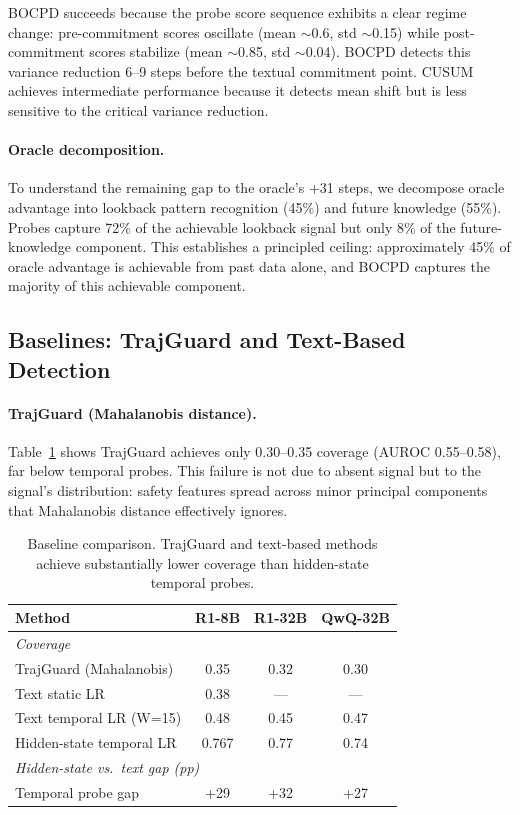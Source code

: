 \documentclass[11pt,a4paper]{article}
\begin{document}
BOCPD succeeds because the probe score sequence exhibits a clear regime change: pre-commitment scores oscillate (mean $\sim$0.6, std $\sim$0.15) while post-commitment scores stabilize (mean $\sim$0.85, std $\sim$0.04). BOCPD detects this variance reduction 6--9 steps before the textual commitment point. CUSUM achieves intermediate performance because it detects mean shift but is less sensitive to the critical variance reduction.

\paragraph{Oracle decomposition.} To understand the remaining gap to the oracle's +31 steps, we decompose oracle advantage into lookback pattern recognition (45\%) and future knowledge (55\%). Probes capture 72\% of the achievable lookback signal but only 8\% of the future-knowledge component. This establishes a principled ceiling: approximately 45\% of oracle advantage is achievable from past data alone, and BOCPD captures the majority of this achievable component.

\subsection{Baselines: TrajGuard and Text-Based Detection}
\label{sec:exp-baselines}

\paragraph{TrajGuard (Mahalanobis distance).} Table~\ref{tab:baselines} shows TrajGuard achieves only 0.30--0.35 coverage (AUROC 0.55--0.58), far below temporal probes. This failure is not due to absent signal but to the signal's distribution: safety features spread across minor principal components that Mahalanobis distance effectively ignores.

\begin{table}[t]
\centering
\small
\begin{tabular}{lccc}
\toprule
\textbf{Method} & \textbf{R1-8B} & \textbf{R1-32B} & \textbf{QwQ-32B} \\
\midrule
\multicolumn{4}{l}{\textit{Coverage}} \\
TrajGuard (Mahalanobis) & 0.35 & 0.32 & 0.30 \\
Text static LR & 0.38 & --- & --- \\
Text temporal LR (W=15) & 0.48 & 0.45 & 0.47 \\
\midrule
Hidden-state temporal LR & 0.767 & 0.77 & 0.74 \\
\midrule
\multicolumn{4}{l}{\textit{Hidden-state vs.\ text gap (pp)}} \\
Temporal probe gap & +29 & +32 & +27 \\
\bottomrule
\end{tabular}
\caption{Baseline comparison. TrajGuard and text-based methods achieve substantially lower coverage than hidden-state temporal probes.}
\label{tab:baselines}
\end{table}
\end{document}

